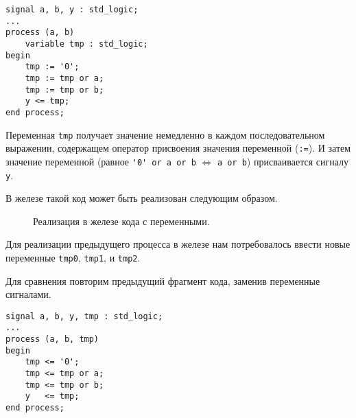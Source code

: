 
\begin{Code}
\begin{lstlisting}
signal a, b, y : std_logic;
...
process (a, b)
    variable tmp : std_logic;
begin
    tmp := '0';
    tmp := tmp or a;
    tmp := tmp or b;
    y <= tmp;
end process;
\end{lstlisting}
\end{Code}

Переменная \lstinline?tmp? получает значение немедленно в каждом последовательном выражении, содержащем оператор присвоения значения переменной (\lstinline?:=?). И затем значение переменной (равное \lstinline?'0' or a or b? $\Leftrightarrow$ \lstinline?a or b?) присваивается сигналу \lstinline?y?.

В железе такой код может быть реализован следующим образом.

\begin{figure}[ht]
\centering
{}
\caption{Реализация в железе кода с переменными.}
\label{hardware_var_0}
\end{figure}

Для реализации предыдущего процесса в железе нам потребовалось ввести новые переменные \lstinline?tmp0?, \lstinline?tmp1?, и \lstinline?tmp2?.

Для сравнения повторим предыдущий фрагмент кода, заменив переменные сигналами.

\begin{Code}
\begin{lstlisting}
signal a, b, y, tmp : std_logic;
...
process (a, b, tmp)
begin
    tmp <= '0';
    tmp <= tmp or a;
    tmp <= tmp or b;
    y   <= tmp;
end process;
\end{lstlisting}
\end{Code}

